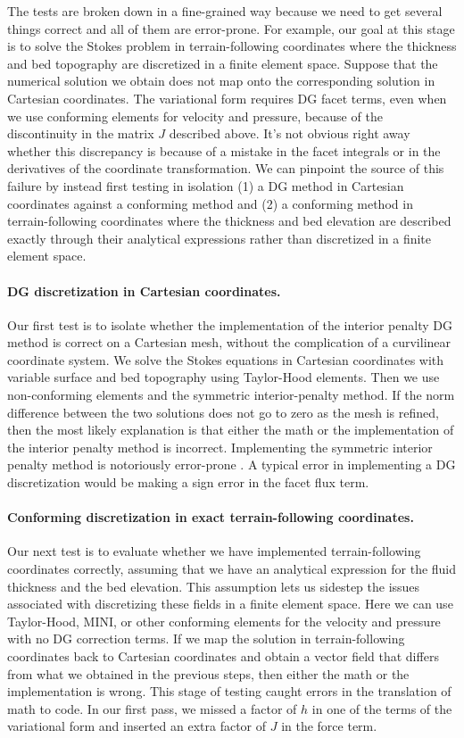 \documentclass[gmd, manuscript]{copernicus}
\begin{document}
The tests are broken down in a fine-grained way because we need to get several things correct and all of them are error-prone.
For example, our goal at this stage is to solve the Stokes problem in terrain-following coordinates where the thickness and bed topography are discretized in a finite element space.
Suppose that the numerical solution we obtain does not map onto the corresponding solution in Cartesian coordinates.
The variational form requires DG facet terms, even when we use conforming elements for velocity and pressure, because of the discontinuity in the matrix $J$ described above.
It's not obvious right away whether this discrepancy is because of a mistake in the facet integrals or in the derivatives of the coordinate transformation.
We can pinpoint the source of this failure by instead first testing in isolation (1) a DG method in Cartesian coordinates against a conforming method and (2) a conforming method in terrain-following coordinates where the thickness and bed elevation are described exactly through their analytical expressions rather than discretized in a finite element space.

\paragraph{DG discretization in Cartesian coordinates.}
Our first test is to isolate whether the implementation of the interior penalty DG method is correct on a Cartesian mesh, without the complication of a curvilinear coordinate system.
We solve the Stokes equations in Cartesian coordinates with variable surface and bed topography using Taylor-Hood elements.
Then we use non-conforming elements and the symmetric interior-penalty method.
If the norm difference between the two solutions does not go to zero as the mesh is refined, then the most likely explanation is that either the math or the implementation of the interior penalty method is incorrect.
Implementing the symmetric interior penalty method is notoriously error-prone \citep{houston2018automatic}.
A typical error in implementing a DG discretization would be making a sign error in the facet flux term.

\paragraph{Conforming discretization in exact terrain-following coordinates.}
Our next test is to evaluate whether we have implemented terrain-following coordinates correctly, assuming that we have an analytical expression for the fluid thickness and the bed elevation.
This assumption lets us sidestep the issues associated with discretizing these fields in a finite element space.
Here we can use Taylor-Hood, MINI, or other conforming elements for the velocity and pressure with no DG correction terms.
If we map the solution in terrain-following coordinates back to Cartesian coordinates and obtain a vector field that differs from what we obtained in the previous steps, then either the math or the implementation is wrong.
This stage of testing caught errors in the translation of math to code.
In our first pass, we missed a factor of $h$ in one of the terms of the variational form and inserted an extra factor of $J$ in the force term.
\end{document}
